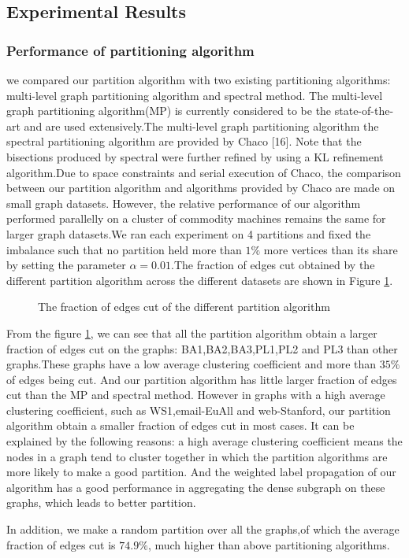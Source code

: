 \documentclass{acm_proc_article-sp}
\begin{document}
\subsection{Experimental Results}
\subsubsection{Performance of partitioning algorithm}
we compared our partition algorithm with two existing partitioning algorithms: multi-level graph partitioning algorithm and spectral method.
The multi-level graph partitioning algorithm(MP) is currently considered to be the state-of-the-art and are used extensively.The multi-level graph partitioning algorithm the spectral partitioning algorithm are provided by Chaco [16]. Note that the bisections produced by spectral were further refined by using a KL refinement algorithm.Due to space constraints and serial execution of Chaco, the comparison between our partition algorithm and algorithms provided by Chaco are made on small graph datasets. However, the relative performance of our algorithm performed parallelly on a cluster of commodity machines remains the same for larger graph datasets.We ran each experiment on 4 partitions and fixed the imbalance such that no partition held more than $1\%$ more vertices than its share by setting the parameter $\alpha=0.01$.The fraction of edges cut obtained by the different partition algorithm across the different datasets  are shown in Figure \ref{fig:per}.
\begin{figure}
\centering
{}
\caption{The fraction of edges cut of the different partition algorithm}
\label{fig:per}
\end{figure}
\par
From the figure \ref{fig:per}, we can see that all the partition algorithm obtain a larger fraction of edges cut on the graphs: BA1,BA2,BA3,PL1,PL2 and PL3 than other graphs.These graphs have a low average clustering coefficient and more than $35\%$ of edges being cut. And our partition algorithm has little larger fraction of edges cut than the MP and spectral method. However in graphs with a high average clustering coefficient, such as WS1,email-EuAll and web-Stanford, our partition algorithm obtain a smaller fraction of edges cut in most cases. It can be explained by the following reasons: a high average clustering coefficient means the nodes in a graph tend to cluster together in which the partition algorithms are more likely to make a good partition. And the weighted label propagation of our algorithm has a good performance in aggregating the dense subgraph on these graphs, which leads to better partition.
\par
In addition, we make a random partition over all the graphs,of which the average fraction of edges cut is $74.9\%$, much higher than above partitioning algorithms.
\end{document}
